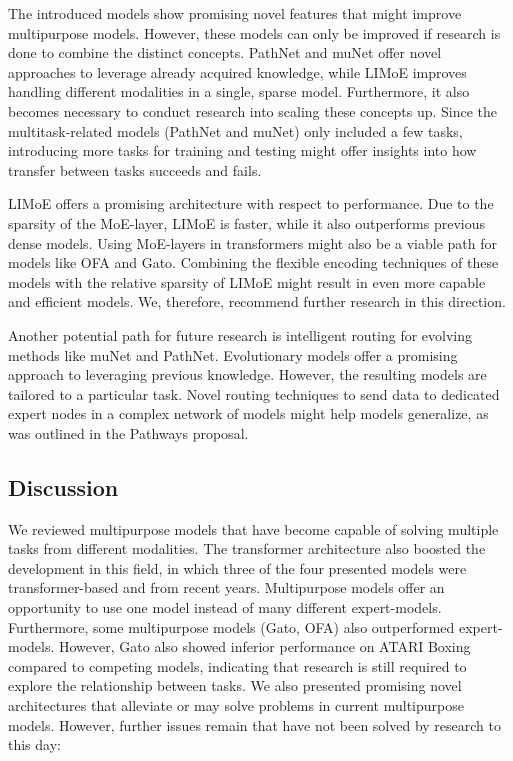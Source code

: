 \documentclass[
]{krantz}
\begin{document}
The introduced models show promising novel features that might improve multipurpose models. However, these models can only be improved if research is done to combine the distinct concepts. PathNet
and muNet offer novel approaches to leverage already acquired knowledge, while LIMoE improves handling different modalities in a single, sparse model.
Furthermore, it also becomes necessary to conduct research into scaling these concepts up. Since the multitask-related models (PathNet and muNet) only included a few tasks, introducing more tasks
for training and testing might offer insights into how transfer between tasks succeeds and fails.

LIMoE offers a promising architecture with respect to performance. Due to the sparsity of the MoE-layer, LIMoE is faster, while it also outperforms previous dense models. Using MoE-layers in
transformers might also be a viable path for models like OFA and Gato. Combining the flexible encoding techniques of these models with the relative sparsity of LIMoE might result in even more capable
and efficient models. We, therefore, recommend further research in this direction.

Another potential path for future research is intelligent routing for evolving methods like muNet and PathNet. Evolutionary models offer a promising approach to leveraging previous knowledge.
However, the resulting models are tailored to a particular task. Novel routing techniques to send data to dedicated expert nodes in a complex network of models might help models generalize,
as was outlined in the Pathways proposal.

\hypertarget{discussion-3}{%
\subsection{Discussion}\label{discussion-3}}

We reviewed multipurpose models that have become capable of solving multiple tasks from different modalities. The transformer architecture also boosted the development in this field, in which
three of the four presented models were transformer-based and from recent years. Multipurpose models offer an opportunity to use one model instead of many different expert-models. Furthermore, some
multipurpose models (Gato, OFA) also outperformed expert-models. However, Gato also showed inferior performance on ATARI Boxing compared to competing models, indicating that research is still
required to explore the relationship between tasks. We also presented promising novel architectures that alleviate or may solve problems in current multipurpose models.
However, further issues remain that have not been solved by research to this day:
\end{document}
